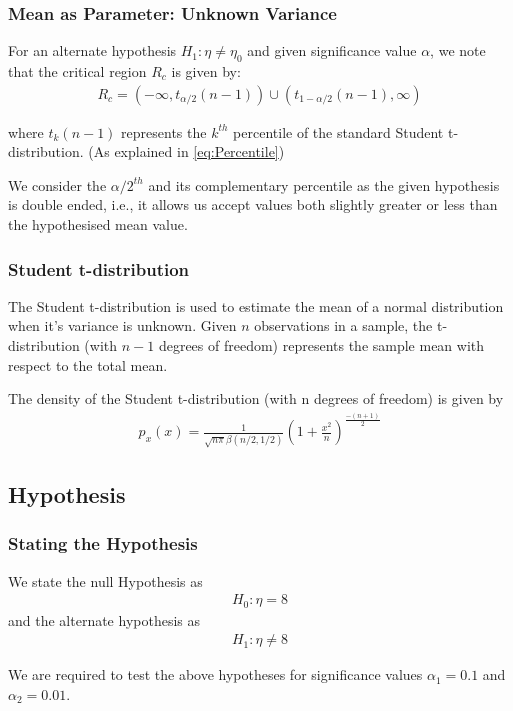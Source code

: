 \documentclass{beamer}
\begin{document}
\begin{frame}
	\frametitle{Mean as Parameter: Unknown Variance}
	For an alternate hypothesis $H_1: \eta \neq \eta_0$ and given significance value $\alpha$, we note that the critical region $R_c$ is given by:
	\begin{align}
		R_c = (-\infty, t_{\alpha/2}(n - 1)) \cup (t_{1-\alpha/2}(n - 1), \infty)
		\label{eq:CriticalReg}
	\end{align}

	where $t_k(n - 1)$ represents the $k^{th}$ percentile of the standard Student t-distribution. (As explained in \eqref{eq:Percentile})

	We consider the $\alpha/2^{th}$ and its complementary percentile as the given hypothesis is double ended, i.e., it allows us accept values both slightly greater or less than the hypothesised mean value.

\end{frame}

\begin{frame}
	\frametitle{Student t-distribution}
	The Student t-distribution is used to estimate the mean of a normal distribution when it's variance is unknown. Given $n$ observations in a sample, the t-distribution (with $n - 1$ degrees of freedom) represents the sample mean with respect to the total mean.

	The density of the Student t-distribution (with n degrees of freedom) is given by
	\begin{align}
		p_x(x) = \frac{1}{\sqrt{n\pi}\beta(n/2, 1/2)}(1 + \frac{x^2}{n})^\frac{-(n+1)}{2}
	\end{align}
\end{frame}

\subsection{Hypothesis}
\begin{frame}
	\frametitle{Stating the Hypothesis}
	We state the null Hypothesis as
	\begin{align}
		H_0 : \eta = 8
		\label{eq:NullHyp}
	\end{align}
	and the alternate hypothesis as
	\begin{align}
		H_1 : \eta \neq 8
		\label{eq:AltHyp}
	\end{align}

	We are required to test the above hypotheses for significance values $\alpha_1 = 0.1$ and $\alpha_2 = 0.01$.
\end{frame}
\end{document}
